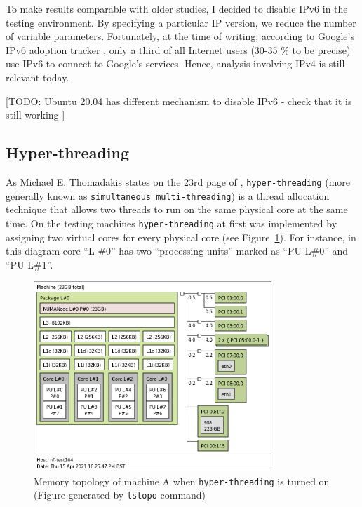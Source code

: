 \documentclass[12pt,a4paper,twoside,openright]{report}
\begin{document}
To make results comparable with older studies, I decided to disable IPv6 in the testing environment.
By specifying a particular IP version, we reduce the number of variable parameters.
Fortunately, at the time of writing, according to Google's IPv6 adoption tracker \cite{IPv6_Adoption_Statistics}, only a third of all Internet users (30-35 \% to be precise) use IPv6 to connect to Google's services.
Hence, analysis involving IPv4 is still relevant today.

[TODO: Ubuntu 20.04 has different mechanism  to disable IPv6 - check that it is still working ]

\subsection{Hyper-threading}\label{Hyperthreading_Subsection_Tag}

As Michael E. Thomadakis states on the 23rd page of \cite{hyperthreading_book}, \texttt{hyper-threading} (more generally known as \texttt{simultaneous multi-threading}) is a thread allocation technique that allows two threads to run on the same physical core at the same time.
On the testing machines \texttt{hyper-threading} at first was implemented by assigning two virtual cores for every physical core (see Figure~\ref{fig:topology_with_hyperthreading}).
For instance, in this diagram core \enquote{L \#0} has two \enquote{processing units} marked as \enquote{PU L\#0} and \enquote{PU L\#1}.

    \begin{figure}[H]
    \centering
    \includegraphics[width=0.8\textwidth]{figs/topology_with_hyperthreading.png}
    \caption{Memory topology of machine A when \texttt{hyper-threading} is turned on (Figure generated by \texttt{lstopo} command)}
    \label{fig:topology_with_hyperthreading}
    \end{figure}
\end{document}
